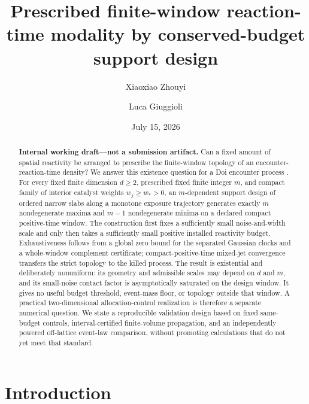 \documentclass[aps,physrev,reprint,amsmath,amssymb,longbibliography,floatfix]{revtex4-2}
\begin{document}
\title{Prescribed finite-window reaction-time modality by conserved-budget support design}

\author{Xiaoxiao Zhouyi}
\author{Luca Giuggioli}

\date{July 15, 2026}

\begin{abstract}
\textbf{Internal working draft---not a submission artifact.}
Can a fixed amount of spatial reactivity be arranged to prescribe the
finite-window topology of an encounter-reaction-time density?  We answer this
existence question for a Doi encounter process \cite{doi1976stochastic}.
For every fixed finite dimension $d\ge2$, prescribed fixed finite integer
$m$, and compact family of interior catalyst weights $w_j\ge w_*>0$, an
$m$-dependent support design of ordered narrow slabs along a monotone exposure
trajectory generates exactly $m$ nondegenerate maxima and $m-1$ nondegenerate
minima on a declared compact positive-time window.  The construction first
fixes a sufficiently small noise-and-width scale and only then takes a
sufficiently small positive installed reactivity budget.  Exhaustiveness
follows from a global zero bound for the separated Gaussian clocks and a
whole-window complement certificate; compact-positive-time mixed-jet
convergence transfers the strict topology to the killed process.  The result
is existential and deliberately nonuniform: its geometry and admissible
scales may depend on $d$ and $m$, and its small-noise contact factor is
asymptotically saturated on the design window.  It gives no useful budget
threshold, event-mass floor, or topology outside that window.  A practical
two-dimensional allocation-control realization is therefore a separate
numerical question.  We state a reproducible validation design based on fixed
same-budget controls, interval-certified finite-volume propagation, and an
independently powered off-lattice event-law comparison, without promoting
calculations that do not yet meet that standard.
\end{abstract}

\maketitle

\section{Introduction}
\label{sec:introduction}
\end{document}
